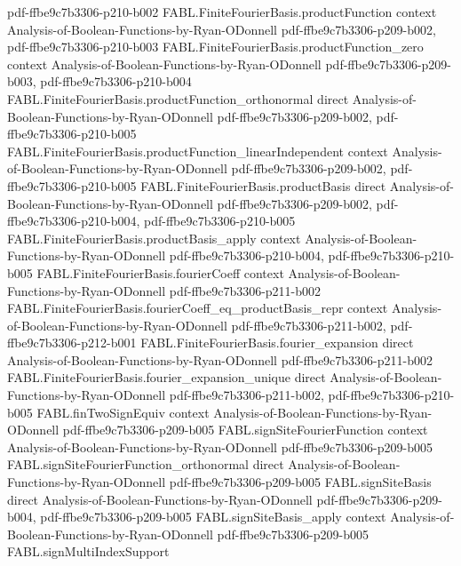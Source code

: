 \begin{theorem}
{    pdf-ffbe9c7b3306-p210-b002}
\proofstep
  {FABL.FiniteFourierBasis.productFunction}
  {context}
  {Analysis-of-Boolean-Functions-by-Ryan-ODonnell}
  {pdf-ffbe9c7b3306-p209-b002,
    pdf-ffbe9c7b3306-p210-b003}
\proofstep
  {FABL.FiniteFourierBasis.productFunction_zero}
  {context}
  {Analysis-of-Boolean-Functions-by-Ryan-ODonnell}
  {pdf-ffbe9c7b3306-p209-b003,
    pdf-ffbe9c7b3306-p210-b004}
\proofstep
  {FABL.FiniteFourierBasis.productFunction_orthonormal}
  {direct}
  {Analysis-of-Boolean-Functions-by-Ryan-ODonnell}
  {pdf-ffbe9c7b3306-p209-b002,
    pdf-ffbe9c7b3306-p210-b005}
\proofstep
  {FABL.FiniteFourierBasis.productFunction_linearIndependent}
  {context}
  {Analysis-of-Boolean-Functions-by-Ryan-ODonnell}
  {pdf-ffbe9c7b3306-p209-b002,
    pdf-ffbe9c7b3306-p210-b005}
\proofstep
  {FABL.FiniteFourierBasis.productBasis}
  {direct}
  {Analysis-of-Boolean-Functions-by-Ryan-ODonnell}
  {pdf-ffbe9c7b3306-p209-b002,
    pdf-ffbe9c7b3306-p210-b004,
    pdf-ffbe9c7b3306-p210-b005}
\proofstep
  {FABL.FiniteFourierBasis.productBasis_apply}
  {context}
  {Analysis-of-Boolean-Functions-by-Ryan-ODonnell}
  {pdf-ffbe9c7b3306-p210-b004,
    pdf-ffbe9c7b3306-p210-b005}
\proofstep
  {FABL.FiniteFourierBasis.fourierCoeff}
  {context}
  {Analysis-of-Boolean-Functions-by-Ryan-ODonnell}
  {pdf-ffbe9c7b3306-p211-b002}
\proofstep
  {FABL.FiniteFourierBasis.fourierCoeff_eq_productBasis_repr}
  {context}
  {Analysis-of-Boolean-Functions-by-Ryan-ODonnell}
  {pdf-ffbe9c7b3306-p211-b002,
    pdf-ffbe9c7b3306-p212-b001}
\proofstep
  {FABL.FiniteFourierBasis.fourier_expansion}
  {direct}
  {Analysis-of-Boolean-Functions-by-Ryan-ODonnell}
  {pdf-ffbe9c7b3306-p211-b002}
\proofstep
  {FABL.FiniteFourierBasis.fourier_expansion_unique}
  {direct}
  {Analysis-of-Boolean-Functions-by-Ryan-ODonnell}
  {pdf-ffbe9c7b3306-p211-b002,
    pdf-ffbe9c7b3306-p210-b005}
\proofstep
  {FABL.finTwoSignEquiv}
  {context}
  {Analysis-of-Boolean-Functions-by-Ryan-ODonnell}
  {pdf-ffbe9c7b3306-p209-b005}
\proofstep
  {FABL.signSiteFourierFunction}
  {context}
  {Analysis-of-Boolean-Functions-by-Ryan-ODonnell}
  {pdf-ffbe9c7b3306-p209-b005}
\proofstep
  {FABL.signSiteFourierFunction_orthonormal}
  {direct}
  {Analysis-of-Boolean-Functions-by-Ryan-ODonnell}
  {pdf-ffbe9c7b3306-p209-b005}
\proofstep
  {FABL.signSiteBasis}
  {direct}
  {Analysis-of-Boolean-Functions-by-Ryan-ODonnell}
  {pdf-ffbe9c7b3306-p209-b004,
    pdf-ffbe9c7b3306-p209-b005}
\proofstep
  {FABL.signSiteBasis_apply}
  {context}
  {Analysis-of-Boolean-Functions-by-Ryan-ODonnell}
  {pdf-ffbe9c7b3306-p209-b005}
\proofstep
  {FABL.signMultiIndexSupport}

\end{theorem}
